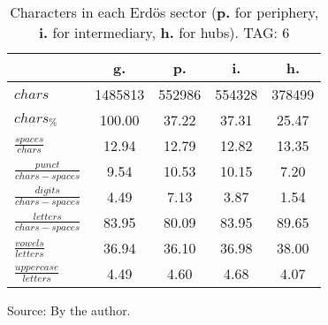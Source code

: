 \begin{table}[h!]
\begin{center}
\caption{Characters in each Erd\"os sector ({{\bf p.}} for periphery, {{\bf i.}} for intermediary, 
	{{\bf h.}} for hubs). TAG: 6}\label{tab:cha}
	\def\arraystretch{1.5}
\begin{tabular}{ l || c | c | c | c}\hline
 & {\bf g.} & {\bf p.} & {\bf i.} & {\bf h.} \\\hline\hline
$chars$ & 1485813  & 552986  & 554328  & 378499 \\
$chars_{\%}$ & 100.00  & 37.22  & 37.31  & 25.47 \\\hline
$\frac{spaces}{chars}$ & 12.94  & 12.79  & 12.82  & 13.35 \\
$\frac{punct}{chars-spaces}$ & 9.54  & 10.53  & 10.15  & 7.20 \\
$\frac{digits}{chars-spaces}$ & 4.49  & 7.13  & 3.87  & 1.54 \\\hline
$\frac{letters}{chars-spaces}$ & 83.95  & 80.09  & 83.95  & 89.65 \\
$\frac{vowels}{letters}$ & 36.94  & 36.10  & 36.98  & 38.00 \\
$\frac{uppercase}{letters}$ & 4.49  & 4.60  & 4.68  & 4.07 \\\hline
\end{tabular}
\begin{flushleft}\footnotesize
		Source: By the author.\
\end{flushleft}
\end{center}
\end{table}

